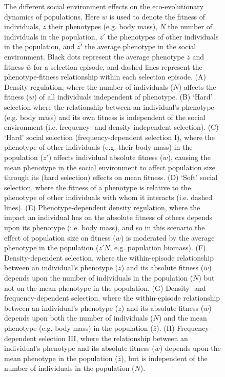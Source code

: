 \documentclass{article}
\begin{document}
\begin{figure} [H]
	\caption{The different social environment effects on the eco-evolutionary dynamics of populations. Here $w$ is used to denote the fitness of individuals, $z$ their phenotypes (e.g. body mass), $N$ the number of individuals in the population, $z'$ the phenotypes of other individuals in the population, and $\bar{z'}$ the average phenotype in the social environment. Black dots represent the average phenotype $\bar{z}$ and fitness $\bar{w}$ for a selection episode, and dashed lines represent the phenotype-fitness relationship within each selection episode. (A) Density regulation, where the number of individuals ($N$) affects the fitness ($w$) of all individuals independent of phenotype. (B) `Hard' selection where the relationship between an individual's phenotype (e.g. body mass) and its own fitness is independent of the social environment (i.e. frequency- and density-independent selection). (C) `Hard' social selection (frequency-dependent selection I), where the phenotype of other individuals (e.g. their body mass) in the population ($z'$) affects individual absolute fitness ($w$), causing the mean phenotype in the social environment to affect population size through its (hard selection) effects on mean fitness. (D) `Soft' social selection, where the fitness of a phenotype is relative to the phenotype of other individuals with whom it interacts (i.e. dashed lines). (E) Phenotype-dependent density regulation, where the impact an individual has on the absolute fitness of others depends upon its phenotype (i.e. body mass), and so in this scenario the effect of population size on fitness ($w$) is moderated by the average phenotype in the population ($\bar{z'}N$, e.g. population biomass). (F) Density-dependent selection, where the within-episode relationship between an individual's phenotype ($z$) and its absolute fitness ($w$) depends upon the number of individuals in the population ($N$) but not on the mean phenotype in the population. (G) Density- and frequency-dependent selection, where the within-episode relationship between an individual's phenotype ($z$) and its absolute fitness ($w$) depends upon both the number of individuals ($N$) and the mean phenotype (e.g. body mass) in the population ($\bar{z}$). (H) Frequency-dependent selection III, where the relationship between an individual's phenotype and its absolute fitness ($w$) depends upon the mean phenotype in the population ($\bar{z}$), but is independent of the number of individuals in the population ($N$).} \label{fig:selection}
\end{figure}
\end{document}
